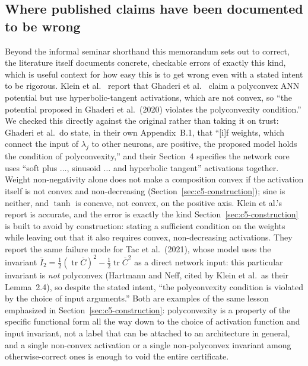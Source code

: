 \documentclass[10pt,a4paper]{article}
\newcommand{\tr}{\operatorname{tr}}
\begin{document}
\subsection{Where published claims have been documented to be wrong}
\label{sec:related-wrong}
Beyond the informal seminar shorthand this memorandum sets out to correct,
the literature itself documents concrete, checkable errors of exactly this
kind, which is useful context for how easy this is to get wrong even with
a stated intent to be rigorous.  Klein et al.~\cite{Klein2022} report that
Ghaderi et al.~\cite{Ghaderi2020} claim a polyconvex ANN potential but use
hyperbolic-tangent activations, which are not convex, so ``the potential
proposed in Ghaderi et al.\ (2020) violates the polyconvexity condition.''
We checked this directly against the original rather than taking it on
trust: Ghaderi et al.\ do state, in their own Appendix~B.1, that ``[i]f
weights, which connect the input of $\lambda_j$ to other neurons, are
positive, the proposed model holds the condition of polyconvexity,'' and
their Section~4 specifies the network core uses ``soft plus $\dots$,
sinusoid $\dots$ and hyperbolic tangent'' activations together. Weight
non-negativity alone does not make a composition convex if the activation
itself is not convex and non-decreasing (Section~\ref{sec:c5-construction});
sine is neither, and $\tanh$ is concave, not convex, on the positive
axis. Klein et al.'s report is accurate, and the error is exactly the
kind Section~\ref{sec:c5-construction} is built to avoid by construction:
stating a sufficient condition on the weights while leaving out that it
also requires convex, non-decreasing activations. They report the same
failure mode for Tac et al.\ (2021), whose model uses
the invariant $\bar I_2=\tfrac12(\tr\bar C)^2-\tfrac12\tr\bar C^2$ as a
direct network input: this particular invariant is \emph{not} polyconvex
(Hartmann and Neff, cited by Klein et al.\ as their Lemma~2.4), so despite
the stated intent, ``the polyconvexity condition is violated by the choice
of input arguments.'' Both are examples of the same lesson emphasized in
Section~\ref{sec:c5-construction}: polyconvexity is a property of the
specific functional form all the way down to the choice of activation
function and input invariant, not a label that can be attached to an
architecture in general, and a single non-convex activation or a single
non-polyconvex invariant among otherwise-correct ones is enough to void
the entire certificate.
\end{document}
